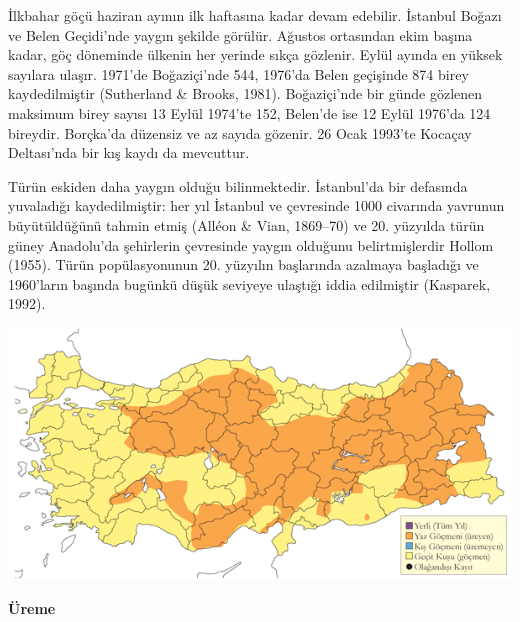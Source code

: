 \documentclass[
  a4paper,
  DIV=11,
  numbers=noendperiod]{scrreprt}
\begin{document}
İlkbahar göçü haziran ayının ilk haftasına kadar devam edebilir.
İstanbul Boğazı ve Belen Geçidi'nde yaygın şekilde görülür. Ağustos
ortasından ekim başına kadar, göç döneminde ülkenin her yerinde sıkça
gözlenir. Eylül ayında en yüksek sayılara ulaşır. 1971'de Boğaziçi'nde
544, 1976'da Belen geçişinde 874 birey kaydedilmiştir (Sutherland \&
Brooks, 1981). Boğaziçi'nde bir günde gözlenen maksimum birey sayısı 13
Eylül 1974'te 152, Belen'de ise 12 Eylül 1976'da 124 bireydir. Borçka'da
düzensiz ve az sayıda gözenir. 26 Ocak 1993'te Kocaçay Deltası'nda bir
kış kaydı da mevcuttur.

Türün eskiden daha yaygın olduğu bilinmektedir. İstanbul'da bir
defasında yuvaladığı kaydedilmiştir: her yıl İstanbul ve çevresinde 1000
civarında yavrunun büyütüldüğünü tahmin etmiş (Alléon \& Vian, 1869--70)
ve 20. yüzyılda türün güney Anadolu'da şehirlerin çevresinde yaygın
olduğunu belirtmişlerdir Hollom (1955). Türün popülasyonunun 20.
yüzyılın başlarında azalmaya başladığı ve 1960'ların başında bugünkü
düşük seviyeye ulaştığı iddia edilmiştir (Kasparek, 1992).

\includegraphics{images/harita_Page_084.png}

\textbf{Üreme}
\end{document}
